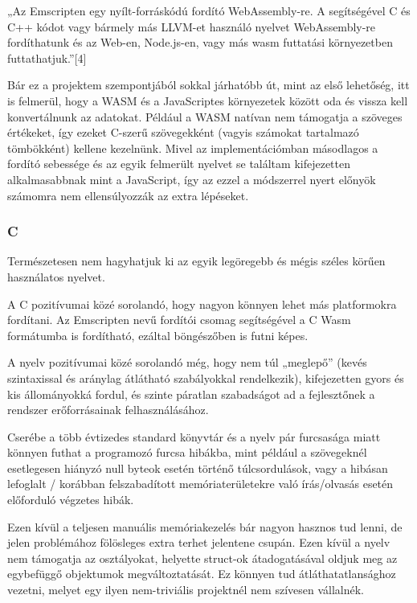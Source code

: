 „Az Emscripten egy nyílt-forráskódú fordító WebAssembly-re. A segítségével C és C++ kódot vagy bármely más LLVM-et használó nyelvet WebAssembly-re fordíthatunk és az Web-en, Node.js-en, vagy más wasm futtatási környezetben futtathatjuk.”[4]

Bár ez a projektem szempontjából sokkal járhatóbb út, mint az első lehetőség, itt is felmerül, hogy a WASM és a JavaScriptes környezetek között oda és vissza kell konvertálnunk az adatokat. Például a WASM natívan nem támogatja a szöveges értékeket\cite{wasmstring}, így ezeket C-szerű szövegekként (vagyis számokat tartalmazó tömbökként) kellene kezelnünk. Mivel az implementációmban másodlagos a fordító sebessége és az egyik felmerült nyelvet se találtam kifejezetten alkalmasabbnak mint a JavaScript, így az ezzel a módszerrel nyert előnyök számomra nem ellensúlyozzák az extra lépéseket.

\subsubsection{C}

Természetesen nem hagyhatjuk ki az egyik legöregebb és mégis széles körűen használatos nyelvet.

A C pozitívumai közé sorolandó, hogy nagyon könnyen lehet más platformokra fordítani. Az Emscripten nevű fordítói csomag segítségével a C Wasm formátumba is fordítható, ezáltal böngészőben is futni képes.

A nyelv pozitívumai közé sorolandó még, hogy nem túl „meglepő” (kevés szintaxissal és aránylag átlátható szabályokkal rendelkezik), kifejezetten gyors és kis állományokká fordul, és szinte páratlan szabadságot ad a fejlesztőnek a rendszer erőforrásainak felhasználásához.

Cserébe a több évtizedes standard könyvtár és a nyelv pár furcsasága miatt könnyen futhat a programozó furcsa hibákba, mint például a szövegeknél esetlegesen hiányzó null byteok esetén történő túlcsordulások, vagy a hibásan lefoglalt / korábban felszabadított memóriaterületekre való írás/olvasás esetén előforduló végzetes hibák.

Ezen kívül a teljesen manuális memóriakezelés bár nagyon hasznos tud lenni, de jelen problémához fölösleges extra terhet jelentene csupán. Ezen kívül a nyelv nem támogatja az osztályokat, helyette struct-ok átadogatásával oldjuk meg az egybefüggő objektumok megváltoztatását. Ez könnyen tud átláthatatlansághoz vezetni, melyet egy ilyen nem-triviális projektnél nem szívesen vállalnék.

